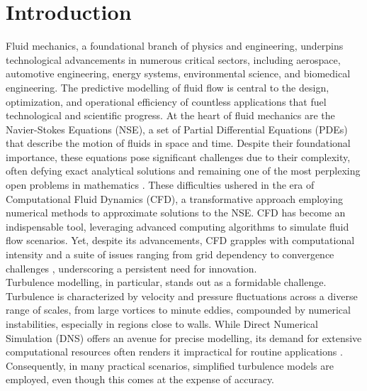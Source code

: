 \chapter{Introduction}
\label{chap:Intro}
Fluid mechanics, a foundational branch of physics and engineering, underpins technological advancements in numerous critical sectors, including aerospace, automotive engineering, energy systems, environmental science, and biomedical engineering. The predictive modelling of fluid flow is central to the design, optimization, and operational efficiency of countless applications that fuel technological and scientific progress. At the heart of fluid mechanics are the Navier-Stokes Equations (NSE), a set of Partial Differential Equations (PDEs) that describe the motion of fluids in space and time. Despite their foundational importance, these equations pose significant challenges due to their complexity, often defying exact analytical solutions and remaining one of the most perplexing open problems in mathematics \cite{fefferman2006existence}. These difficulties ushered in the era of Computational Fluid Dynamics (CFD), a transformative approach employing numerical methods to approximate solutions to the NSE. CFD has become an indispensable tool, leveraging advanced computing algorithms to simulate fluid flow scenarios. Yet, despite its advancements, CFD grapples with computational intensity and a suite of issues ranging from grid dependency to convergence challenges  \cite{ferziger2002computational}, underscoring a persistent need for innovation.\\
Turbulence modelling, in particular, stands out as a formidable challenge. Turbulence is characterized by velocity and pressure fluctuations across a diverse range of scales, from large vortices to minute eddies, compounded by numerical instabilities, especially in regions close to walls. While Direct Numerical Simulation (DNS) offers an avenue for precise modelling, its demand for extensive computational resources often renders it impractical for routine applications  \cite{moin1998direct}. Consequently, in many practical scenarios, simplified turbulence models are employed, even though this comes at the expense of accuracy.\\
